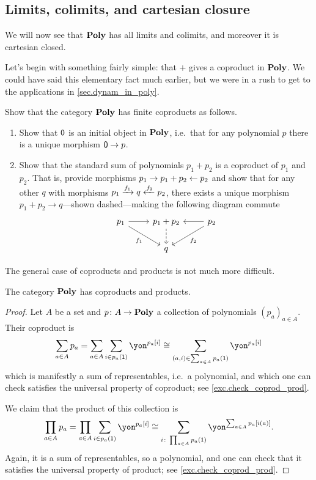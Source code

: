 \documentclass[DynamicalBook]{subfiles}
\begin{document}
\subsection{Limits, colimits, and cartesian closure}

We will now see that $\textbf{Poly}$ has all limits and colimits, and moreover it is cartesian closed.

Let's begin with something fairly simple: that $+$ gives a coproduct in $\textbf{Poly}$. We could have said this elementary fact much earlier, but we were in a rush to get to the applications in \cref{sec.dynam_in_poly}.

\begin{exercise}
Show that the category $\textbf{Poly}$ has finite coproducts as follows.
\begin{enumerate}
	\item Show that $\textsf{0}$ is an initial object in $\textbf{Poly}$, i.e.\ that for any polynomial $p$ there is a unique morphism $\textsf{0}\to p$.
	\item Show that the standard sum of polynomials $p_1+p_2$ is a coproduct of $p_1$ and $p_2$. That is, provide morphisms $p_1\to p_1+p_2\leftarrow p_2$ and show that for any other $q$ with morphisms $p_1\xrightarrow{f_1} q\xleftarrow{f_2} p_2$, there exists a unique morphism $p_1+p_2\to q$---shown dashed---making the following diagram commute 
	\[
	\begin{tikzcd}
		p_1\ar[r]\ar[dr, "f_1"']&
		p_1+p_2\ar[d, dashed]&
		p_2\ar[l]\ar[dl, "f_2"]\\&
		q
	\end{tikzcd}
	\qedhere
	\]
\end{enumerate}
\end{exercise}

The general case of coproducts and products is not much more difficult.

\begin{proposition}\label{prop.coprod_prod_poly}
The category $\textbf{Poly}$ has coproducts and products.
\end{proposition}
\begin{proof}
Let $A$ be a set and $p\colon A\to\textbf{Poly}$ a collection of polynomials $(p_a)_{a\in A}$.%
Their coproduct is
\begin{equation}\label{eqn.sum_polys}
\sum_{a\in A}p_a=\sum_{a\in A}\sum_{i\in p_a(\1)}\yon^{p_a[i]}\cong\sum_{(a,i)\in\sum_{a\in A}p_a(\1)}\yon^{p_a[i]}
\end{equation}
which is manifestly a sum of representables, i.e.\ a polynomial, and which one can check satisfies the universal property of coproduct; see \cref{exc.check_coprod_prod}.

We claim that the product of this collection is
\begin{equation}\label{eqn.prod_polys}
\prod_{a\in A}p_a=
\prod_{a\in A}\sum_{i\in p_a(\1)}\yon^{p_a[i]}\cong
\sum_{i\colon \prod_{a\in A}p_a(\1)}\yon^{\sum_{a\in A}p_a[i(a)]}.
\end{equation}
Again, it is a sum of representables, so a polynomial, and one can check that it satisfies the universal property of product; see \cref{exc.check_coprod_prod}.
\end{proof}
\end{document}

